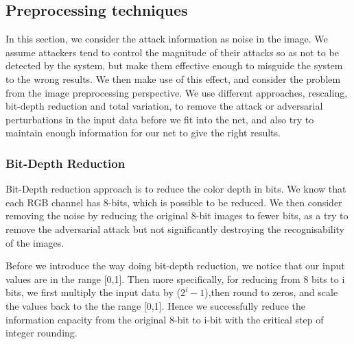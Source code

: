 \subsection{Preprocessing techniques}
In this section, we consider the attack information as noise in the image. We assume attackers tend to control the magnitude of their attacks so as not to be detected by the system, but make them effective enough to misguide the system to the wrong results. We then make use of this effect, and consider the problem from the image preprocessing perspective. We use different approaches, rescaling, bit-depth reduction and total variation, to remove the attack or adversarial perturbations in the input data before we fit into the net, and also try to maintain enough information for our net to give the right results.

\subsubsection{Bit-Depth Reduction} %
Bit-Depth reduction approach is to reduce the color depth in bits. We know that each RGB channel has 8-bits, which is possible to be reduced. We then consider removing the noise by reducing the original 8-bit images to fewer bits, as a try to remove the adversarial attack but not significantly destroying the recognisability of the images. 

Before we introduce the way doing bit-depth reduction, we notice that our input values are in the range [0,1]. Then more specifically, for reducing from 8 bits to i bits, we first multiply the input data by ($2^i - 1$),then round to zeros, and scale the values back to the the range [0,1]. Hence we successfully reduce the information capacity from the original 8-bit to i-bit with the critical step of integer rounding. 


